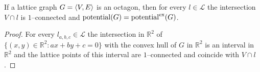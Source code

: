 \begin{lemma}
\label{lem:geo_of_oct}
If a lattice graph $G={\langle} V,E{\rangle}$ is an octagon, then for every $l \in \mathcal{L}$ the intersection $V \cap l$ is $1$--connected and  $\operatorname{potential}(G) = \operatorname{potential}^{\operatorname{ex}}(G)$.
\end{lemma}
\begin{proof}
For every $l_{a,b,c}\in\mathcal{L}$ the intersection in ${\mathbb R}^2$ of $\{ (x,y)\in \mathbb{R}^2: ax + by + c = 0\}$ with the convex hull of $G$ in ${\mathbb R}^2$ is an interval in ${\mathbb R}^2$ and the lattice points of this interval are $1$--connected and coincide with $V\cap l$. %
\end{proof}


